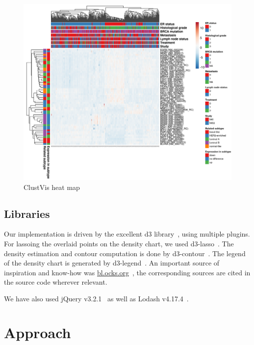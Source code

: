 \documentclass{vgtc} %
\begin{document}
\begin{figure}[bt]
    \centering
    \includegraphics[width=\columnwidth]{clustvis-heat}
    \caption{ClustVis heat map}
    \label{fig:clustvis-heatmap}
\end{figure}

\subsection{Libraries}

Our implementation is driven by the excellent d3 library~\cite{d3}, using
multiple plugins. For lassoing the overlaid points on the density chart, we
used d3-lasso~\cite{d3-lasso}. The density estimation and contour computation
is done by d3-contour~\cite{d3-contour}. The legend of the density chart is
generated by d3-legend~\cite{d3-legend}. An important source of inspiration and
know-how was \url{bl.ocks.org}~\cite{blocks}, the corresponding sources are
cited in the source code wherever relevant.

We have also used jQuery v3.2.1~\cite{jquery} as well as Lodash
v4.17.4~\cite{lodash}.

\vfill

\section{Approach} %
\end{document}
